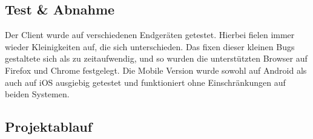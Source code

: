 \subsection{Test \& Abnahme}
Der Client wurde auf verschiedenen Endgeräten getestet. Hierbei fielen
immer wieder Kleinigkeiten auf, die sich unterschieden. Das fixen
dieser kleinen Bugs gestaltete sich als zu zeitaufwendig, und so wurden
die unterstützten Browser auf Firefox und Chrome festgelegt.
Die Mobile Version wurde sowohl auf Android als auch auf iOS ausgiebig
getestet und funktioniert ohne Einschränkungen auf beiden Systemen.
\subsection{Projektablauf}

